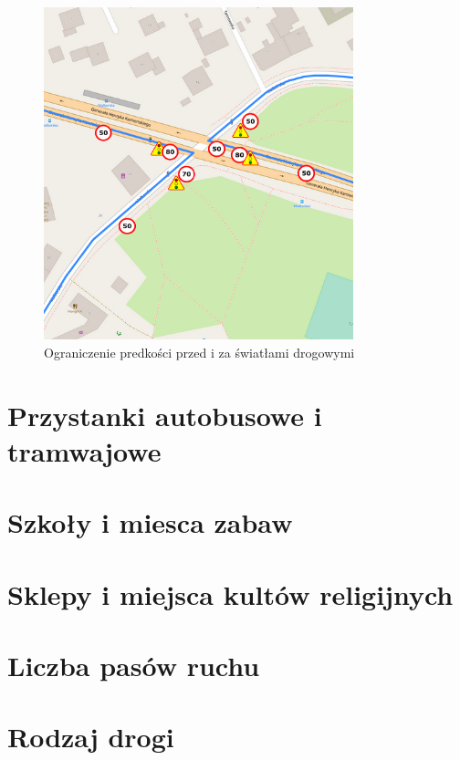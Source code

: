 \begin{figure}[h]
\caption{Ograniczenie predkości przed i za światłami drogowymi}
\label{sec:znakiSwiatla}
\centering
\includegraphics[width=0.8\textwidth]{speedBeforeSignals}
\end{figure}

\newpage
\section{Przystanki autobusowe i tramwajowe}


\newpage
\section{Szkoły i miesca zabaw}


\newpage
\section{Sklepy i miejsca kultów religijnych}


\newpage
\section{Liczba pasów ruchu}


\newpage
\section{Rodzaj drogi}


\newpage
